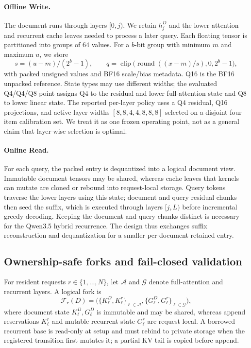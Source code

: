 \documentclass{article}
\begin{document}
\paragraph{Offline Write.}
The document runs through layers $[0,j)$.  We retain $h_j^D$ and the lower
attention and recurrent cache leaves needed to process a later query.  Each
floating tensor is partitioned into groups of 64 values.  For a $b$-bit group
with minimum $m$ and maximum $u$, we store
\begin{equation}
 s=(u-m)/(2^b-1),\qquad q=\operatorname{clip}
 \bigl(\operatorname{round}((x-m)/s),0,2^b-1\bigr),
\end{equation}
with packed unsigned values and BF16 scale/bias metadata.  Q16 is the BF16
unpacked reference.  State types may use different widths; the evaluated
Q4/Q4/Q8 point assigns Q4 to the residual and lower full-attention state and Q8
to lower linear state.  The reported per-layer policy uses a Q4 residual, Q16
projections, and active-layer widths $[8,8,4,4,8,8,8]$ selected on a disjoint
four-item calibration set.  We treat it as one frozen operating point, not as a
general claim that layer-wise selection is optimal.

\paragraph{Online Read.}
For each query, the packed entry is dequantized into a logical document view.
Immutable document tensors may be shared, whereas cache leaves that kernels can
mutate are cloned or rebound into request-local storage.  Query tokens traverse
the lower layers using this state; document and query residual chunks then seed
the suffix, which is executed through layers $[j,L)$ before incremental greedy
decoding.  Keeping the document and query chunks distinct is necessary for the
Qwen3.5 hybrid recurrence.  The design thus exchanges suffix reconstruction
and dequantization for a smaller per-document retained entry.

\subsection{Ownership-safe forks and fail-closed validation}

For resident requests \(r\in\{1,\ldots,N\}\), let \(\mathcal A\) and
\(\mathcal G\) denote full-attention and recurrent layers.  A logical fork is
\begin{equation}
  \mathcal{F}_r(D)=
  \bigl(\{K^D_\ell,K^r_\ell\}_{\ell\in\mathcal A},
        \{G^D_\ell,G^r_\ell\}_{\ell\in\mathcal G}\bigr),
\end{equation}
where document state \(K^D_\ell,G^D_\ell\) is immutable and may be shared,
whereas append reservations \(K^r_\ell\) and mutable recurrent state
\(G^r_\ell\) are request-local.  A borrowed recurrent base is read-only at
setup and must rebind to private storage when the registered transition first
mutates it; a partial KV tail is copied before append.
\end{document}
